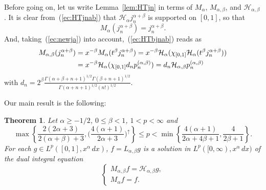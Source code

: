 \documentclass[12pt,leqno]{amsart}
\theoremstyle{plain}
\newtheorem{Thm}{Theorem}[section]
\newcommand{\htra}{\mathcal{H}_\alpha} %
\newcommand{\hab}{\mathcal{H}_{\alpha,\beta}}
\newcommand{\ab}{{(\alpha,\beta)}} %
\begin{document}
Before going on, let us write Lemma~\ref{lem:HTjn} in terms of $M_\alpha$,
$M_{\alpha,\beta}$, and $\hab$. It is clear from~(\ref{ec:HTjnab}) that
$\htra j_n^{\alpha+\beta}$ is supported on $[0,1]$, so that
\begin{equation}
     \label{ec:Majnab}
     M_{\alpha}(j_n^{\alpha+\beta}) = j_n^{\alpha+\beta}.
\end{equation}
And, taking~(\ref{ec:newja}) into account,~(\ref{ec:HTbjnab}) reads as
\begin{align}
    \label{ec:Mabjnab}
    M_{\alpha,\beta}(j_n^{\alpha+\beta})
    &= x^{-\beta} M_\alpha(t^\beta j_n^{\alpha+\beta})
       = x^{-\beta} \htra(\chi_{[0,1]}\htra (t^\beta
                          j_n^{\alpha+\beta})) \\
    &= x^{-\beta} \htra(\chi_{[0,1]} d_n p_n^\ab)
     = d_n \hab p_n^\ab
    \notag
\end{align}
with
$d_n = 2^\beta \tfrac{\Gamma(\alpha+\beta+n+1)^{1/2} \Gamma(\beta+n+1)^{1/2}}
{\Gamma(\alpha+n+1)^{1/2} (n!)^{1/2}}$.

Our main result is the following:

\begin{Thm}
\label{th:solDIE}
Let $\alpha \ge -1/2$, $0\le\beta<1$, $1<p<\infty$ and 
\begin{equation*}
    \max\left\{ \frac{2(2\alpha+3)}{2(\alpha+\beta)+3},
      \Big(\frac{4(\alpha+1)}{2\alpha+3}\Big)^\uparrow \right\}
    \le p <
    \min\left\{\frac{4(\alpha+1)}{2\alpha+4\beta+1},
                \frac{4}{2\beta+1}\right\}.
\end{equation*}
For each $g \in L^p([0,1], x^\alpha \, dx)$, $f = L_{\alpha,\beta}g$ is
a solution in $L^p([0,\infty),x^{\alpha}\,dx)$ of the dual integral
equation
\begin{equation*}
    \left\{
      \begin{array}{l}
         M_{\alpha,\beta}f = \hab g, \\[3pt]
         M_{\alpha}f = f.
      \end{array}
    \right.
\end{equation*}
\end{Thm}
\end{document}
